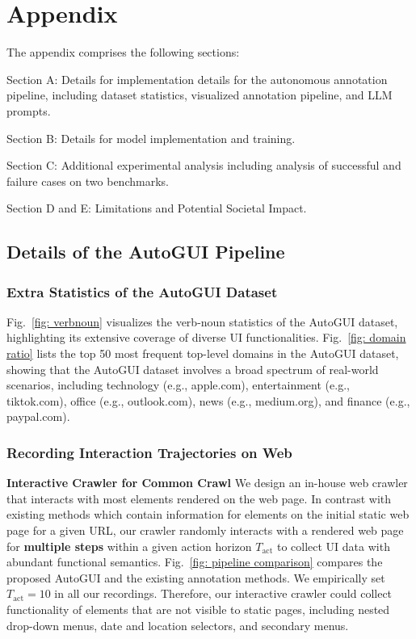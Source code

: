 \newpage
\section{Appendix}

\startcontents

{
\hypersetup{linkcolor=black}
}
\clearpage


The appendix comprises the following sections:

Section A: Details for implementation details for the autonomous annotation pipeline, including dataset statistics, visualized annotation pipeline, and LLM prompts.

Section B: Details for model implementation and training.

Section C: Additional experimental analysis including analysis of successful and failure cases on two benchmarks.

Section D and E: Limitations and Potential Societal Impact.

\subsection{Details of the AutoGUI Pipeline}
\subsubsection{Extra Statistics of the AutoGUI Dataset}
\label{sec:supp:data stats}




Fig.~\ref{fig: verbnoun} visualizes the verb-noun statistics of the AutoGUI dataset, highlighting its extensive coverage of diverse UI functionalities. Fig.~\ref{fig: domain ratio} lists the top 50 most frequent top-level domains in the AutoGUI dataset, showing that the AutoGUI dataset involves a broad spectrum of real-world scenarios, including technology (e.g., apple.com), entertainment (e.g., tiktok.com), office (e.g., outlook.com), news (e.g., medium.org), and finance (e.g., paypal.com).


\subsubsection{Recording Interaction Trajectories on Web}
\label{sec:supp:record traj detail}
\noindent\textbf{Interactive Crawler for Common Crawl} We design an in-house web crawler that interacts with most elements rendered on the web page.
In contrast with existing methods which contain information for elements on the initial static web page for a given URL, our crawler randomly interacts with a rendered web page for \textbf{multiple steps} within a given action horizon $T_\text{act}$ to collect UI data with abundant functional semantics. Fig.~\ref{fig: pipeline comparison} compares the proposed AutoGUI and the existing annotation methods.
We empirically set $T_\text{act} = 10$ in all our recordings.
Therefore, our interactive crawler could collect functionality of elements that are not visible to static pages, including nested drop-down menus, date and location selectors, and secondary menus.


